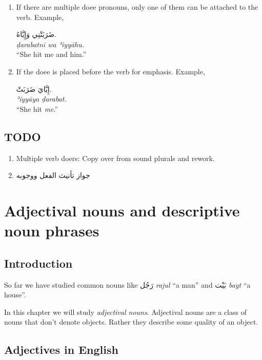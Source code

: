 \documentclass[
  10pt,
]{book}
\providecommand{\tightlist}{%
  \setlength{\itemsep}{0pt}\setlength{\parskip}{0pt}}
\begin{document}
\begin{enumerate}
\def\labelenumi{\roman{enumi}.}
\item
  If there are multiple doee pronouns, only one of them can be attached to the verb. Example,

  \foreignlanguage{arabic}{ضَرَبَتْنِي وَإِيَّاهُ.}\\
  \emph{ḍarabatnī wa ʾiyyāhu.}\\
  \enquote{She hit me and him.}
\item
  If the doee is placed before the verb for emphasis. Example,

  \foreignlanguage{arabic}{إِيَّايَ ضَرَبَتْ.}\\
  \emph{ʾiyyāya ḍarabat.}\\
  \enquote{She hit \emph{me}.}
\end{enumerate}

\section{TODO}\label{todo}

\begin{enumerate}
\def\labelenumi{\arabic{enumi}.}
\tightlist
\item
  Multiple verb doers: Copy over from sound plurals and rework.
\item
  \foreignlanguage{arabic}{جواز تأنيث الفعل ووجوبه}
\end{enumerate}

\chapter{Adjectival nouns and descriptive noun phrases}\label{adjectival-nouns-and-descriptive-noun-phrases}

\section{Introduction}\label{introduction-5}

So far we have studied common nouns like \foreignlanguage{arabic}{رَجُل} \emph{rajul} \enquote{a man} and \foreignlanguage{arabic}{بَيْت} \emph{bayt} \enquote{a house}.

In this chapter we will study \emph{adjectival nouns}. Adjectival nouns are a class of nouns that don't denote objects. Rather they describe some quality of an object.

\section{Adjectives in English}\label{adjectives-in-english}
\end{document}
